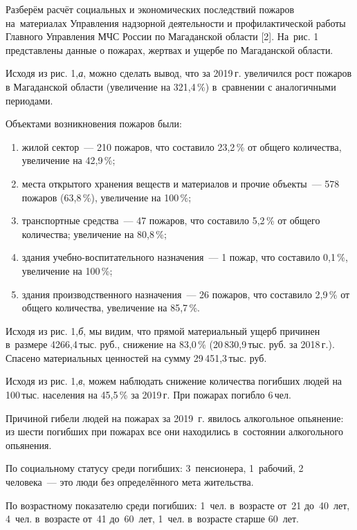  Разберём расчёт социальных и экономических последствий пожаров на~материалах Управления надзорной деятельности и профилактической работы Главного Управления МЧС России по Магаданской области [2]. На~рис. 1 представлены данные о пожарах, жертвах и ущербе по Магаданской области.



Исходя из рис. 1,\textit{а}, можно сделать вывод, что за 2019\,г. увеличился рост пожаров в Магаданской области (увеличение на 321,4\,\%) в~сравнении с аналогичными периодами.

Объектами возникновения пожаров были:
\begin{enumerate}[noitemsep]\vspace{-8pt}
\item жилой сектор~--- 210 пожаров, что составило 23,2\,\% от общего количества, увеличение на 42,9\,\%;
\item места открытого хранения веществ и материалов и прочие объекты~--- 578 пожаров (63,8\,\%), увеличение на 100\,\%;
\item транспортные средства~--- 47 пожаров, что составило 5,2\,\% от общего количества; увеличение на 80,8\,\%;
\item здания учебно-воспитательного назначения~--- 1 пожар, что составило 0,1\,\%, увеличение на 100\,\%;
\item здания производственного назначения~--- 26 пожаров, что составило 2,9\,\% от общего количества, увеличение на 85,7\,\%.
\end{enumerate}
 \vspace{-8pt}

 Исходя из рис. 1,\textit{б}, мы видим, что прямой материальный ущерб причинен в~размере 4266,4\,тыс. руб., снижение на 83,0\,\% (20\,830,9\,тыс. руб. за 2018\,г.). Спасено материальных ценностей на сумму 29\,451,3\,тыс. руб.

 Исходя из рис. 1,\textit{в}, можем наблюдать снижение количества погибших людей на 100\,тыс. населения на 45,5\,\% за 2019\,г. При пожарах погибло 6\,чел.

 Причиной гибели людей на пожарах за 2019~г. явилось алкогольное
 опьянение: из шести погибших при пожарах все они находились в~состоянии алкогольного опьянения.

 По социальному статусу среди погибших: 3~пенсионера, 1~рабочий, 2 человека~--- это люди без определённого мета жительства.

 По возрастному показателю среди погибших: 1~чел. в~возрасте от~21
 до~40~лет, 4~чел. в~возрасте от~41 до~60~лет, 1~чел. в~возрасте старше 60~лет.

